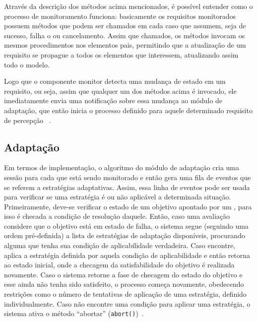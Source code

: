 Através da descrição dos métodos acima mencionados, é possível entender como o processo de monitoramento funciona: basicamente os requisitos monitorados possuem métodos que podem ser chamados em cada caso que assumem, seja de sucesso, falha o ou cancelamento. Assim que chamados, os métodos invocam os mesmos procedimentos nos elementos pais, permitindo que a atualização de um requisito se propague a todos os elementos que interessem, atualizando assim todo o modelo.

Logo que o componente monitor detecta uma mudança de estado em um requisito, ou seja, assim que qualquer um dos métodos acima é invocado, ele imediatamente envia uma notificação sobre essa mudança ao módulo de adaptação, que então inicia o processo definido para aquele determinado requisito de percepção ~\cite{tesevitor}.

\subsection{Adaptação}
\label{sec-referencial-zanshin-adaptacao}
Em termos de implementação, o algoritmo do módulo de adaptação cria uma sessão para cada \awreq que está sendo monitorado e então gera uma fila de eventos que se referem a estratégias adaptativas. Assim, essa linha de eventos pode ser usada para verificar se uma estratégia é ou não aplicável a determinada situação. Primeiramente, deve-se verificar o estado de um objetivo apontado por um \awreq, para isso é checada a condição de resolução daquele. Então, caso uma avaliação considere que o objetivo está em estado de falha, o sistema segue (seguindo uma ordem pré-definida) a lista de estratégias de adaptação disponíveis, procurando alguma que tenha sua condição de aplicabilidade verdadeira. Caso encontre, aplica a estratégia definida por aquela condição de aplicabilidade e então retorna ao estado inicial, onde a checagem da satisfabilidade do objetivo é realizada novamente. Caso o sistema retorne a fase de checagem do estado do objetivo e esse ainda não tenha sido satisfeito, o processo começa novamente, obedecendo restrições como o número de tentativas de aplicação de uma estratégia, definido individualmente. Caso não encontre uma condição para aplicar uma estratégia, o sistema ativa o método ``abortar'' (\texttt{abort()})~\cite{souza2013requirements}. 

